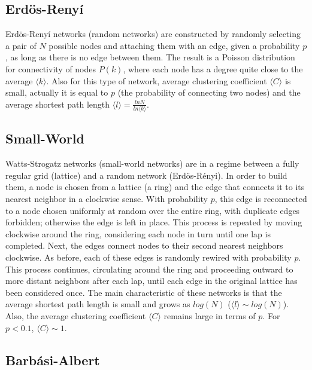\documentclass{bmcart}
\begin{document}
\subsection*{Erd\"{o}s-Reny\'i}

Erd\"{o}s-Reny\'i networks \cite{ErdosRenyi:59} (random networks) are
constructed by randomly selecting a pair of $N$ possible nodes and
attaching them with an edge, given a probability $p$, as long as there
is no edge between them. The result is a Poisson distribution for
connectivity of nodes $P(k)$, where each node has a degree quite close
to the average $\langle k \rangle$. Also for this type of network,
average clustering coefficient $\langle C \rangle$ is small, actually
it is equal to $p$ (the probability of connecting two nodes) and the
average shortest path length
$\langle l \rangle = \frac{lnN}{ln\langle k \rangle}$.


\subsection*{Small-World}

Watts-Strogatz networks \cite{WattsStrogatz:98} (small-world networks)
are in a regime between a fully regular grid (lattice) and a random
network (Erd\"{o}s-R\'enyi). In order to build them, a node is chosen
from a lattice (a ring) and the edge that connects it to its nearest
neighbor in a clockwise sense. With probability $p$, this edge is
reconnected to a node chosen uniformly at random over the entire ring,
with duplicate edges forbidden; otherwise the edge is left in
place. This process is repeated by moving clockwise around the ring,
considering each node in turn until one lap is completed. Next, the
edges connect nodes to their second nearest neighbors clockwise. As
before, each of these edges is randomly rewired with probability
$p$. This process continues, circulating around the ring and
proceeding outward to more distant neighbors after each lap, until
each edge in the original lattice has been considered once. The main
characteristic of these networks is that the average shortest path
length is small and grows as $log(N)$
($\langle l \rangle \sim log(N)$). Also, the average clustering
coefficient $\langle C \rangle$ remains large in terms of $p$. For
$p < 0.1$, $\langle C \rangle \sim 1$.

\subsection*{Barb\'asi-Albert}
\end{document}
